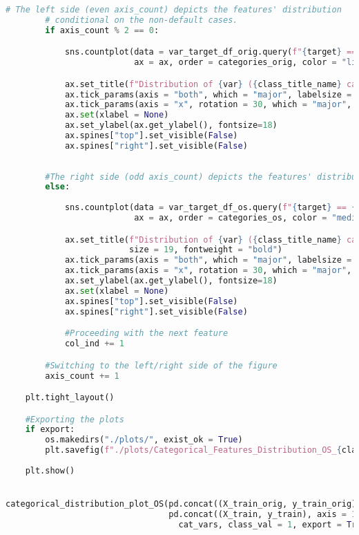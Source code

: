 \begin{lstlisting}[language=Python, basicstyle=\footnotesize\ttfamily]
        # The left side (even axis_count) depicts the features' distribution
        # conditional on the non-default cases.
        if axis_count % 2 == 0:

            sns.countplot(data = var_target_df_orig.query(f"{target} == {class_val}"), x = var,
                          ax = ax, order = categories_orig, color = "lightblue")

            ax.set_title(f"Distribution of {var} ({class_title_name} cases)", size = 19, fontweight = "bold")
            ax.tick_params(axis = "both", which = "major", labelsize = 18)
            ax.tick_params(axis = "x", rotation = 30, which = "major", labelsize = 18)
            ax.set(xlabel = None)
            ax.set_ylabel(ax.get_ylabel(), fontsize=18)
            ax.spines["top"].set_visible(False)
            ax.spines["right"].set_visible(False)
                        
        
        #The right side (odd axis_count) depicts the features' distribution conditional on the default cases.
        else:
            
            sns.countplot(data = var_target_df_os.query(f"{target} == {class_val}"), x = var,
                          ax = ax, order = categories_os, color = "mediumpurple")

            ax.set_title(f"Distribution of {var} ({class_title_name} cases) - Oversampled",
                         size = 19, fontweight = "bold")
            ax.tick_params(axis = "both", which = "major", labelsize = 18)
            ax.tick_params(axis = "x", rotation = 30, which = "major", labelsize = 18)
            ax.set_ylabel(ax.get_ylabel(), fontsize=18)
            ax.set(xlabel = None)
            ax.spines["top"].set_visible(False)
            ax.spines["right"].set_visible(False)

            #Proceeding with the next feature
            col_ind += 1

        #Switching to the left/right side of the figure
        axis_count += 1

    plt.tight_layout()

    #Exporting the plots
    if export:
        os.makedirs("./plots/", exist_ok = True)
        plt.savefig(f"./plots/Categorical_Features_Distribution_OS_{class_title_name}.jpg", dpi = 300)
        
    plt.show()


categorical_distribution_plot_OS(pd.concat((X_train_orig, y_train_orig), axis = 1),
                                 pd.concat((X_train, y_train), axis = 1),
                                   cat_vars, class_val = 1, export = True)


\end{lstlisting}
